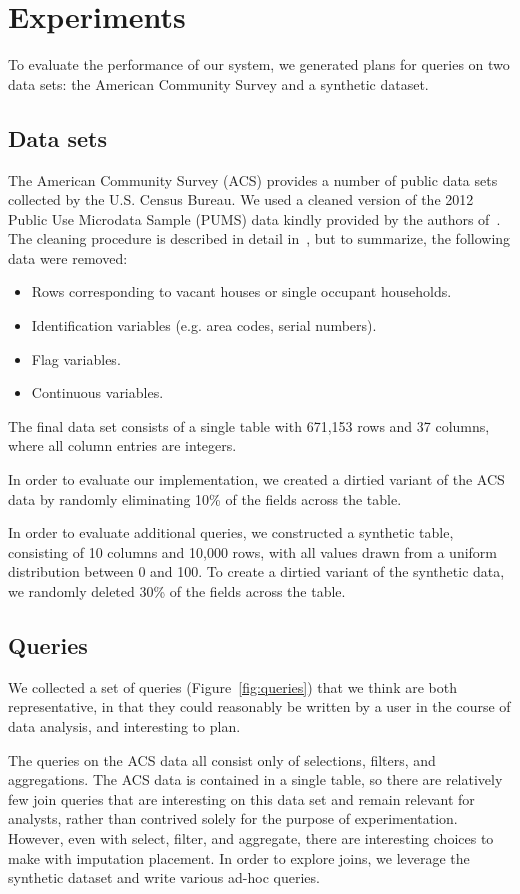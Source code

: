 \section{Experiments}

To evaluate the performance of our system, we generated plans for queries on two data sets: the American Community Survey and a synthetic dataset.
\subsection{Data sets}

The American Community Survey (ACS) provides a number of public data sets collected by the U.S. Census Bureau.
We used a cleaned version of the 2012 Public Use Microdata Sample (PUMS) data kindly provided by the authors of~\cite{akande2015empirical}.
The cleaning procedure is described in detail in~\cite{akande2015empirical}, but to summarize, the following data were removed:
\begin{itemize}
\item Rows corresponding to vacant houses or single occupant households.
\item Identification variables (e.g. area codes, serial numbers).
\item Flag variables.
\item Continuous variables.
\end{itemize}
The final data set consists of a single table with 671,153 rows and 37 columns, where all column entries are integers.

In order to evaluate our implementation, we created a dirtied variant of the ACS data by randomly eliminating
10\% of the fields across the table.

In order to evaluate additional queries, we constructed a synthetic table, consisting of 10 columns and 10,000 rows, with
all values drawn from a uniform distribution between 0 and 100. To create a dirtied variant of the synthetic data, we randomly deleted 30\% of the fields
across the table.

\subsection{Queries}

We collected a set of queries (Figure~\ref{fig:queries}) that we think are both representative, in that they could reasonably be written by a user in the course of data analysis, and interesting to plan.

The queries on the ACS data all consist only of selections, filters, and aggregations.
The ACS data is contained in a single table, so there are relatively few join queries that are interesting on this data set and remain relevant for analysts, rather
than contrived solely for the purpose of experimentation.
However, even with select, filter, and aggregate, there are interesting choices to make with imputation placement. In order to explore joins, we leverage the synthetic
dataset and write various ad-hoc queries.

